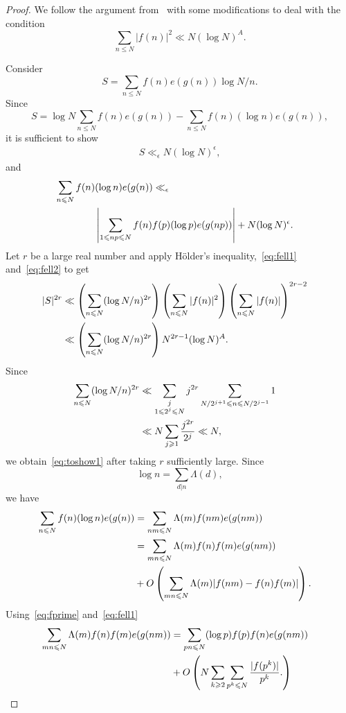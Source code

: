 \documentclass[12pt]{amsart}
\def\\{\cr}
\def\le{\leqslant}
\def\ge{\geqslant}
\begin{document}
\begin{proof}

We follow the argument from~\cite[Section~2]{M-V} with some modifications to deal with the condition
$$\sum_{n\le N}|f(n)|^2\ll N(\log{N})^{A}.$$

Consider 
\begin{equation*}
S=\sum_{n\le N} f(n)e(g(n))\log N/n.
\end{equation*}
Since 
$$S=\log{N}\sum_{n\le N}f(n)e(g(n))-\sum_{n\le N}f(n)(\log{n})e(g(n)),$$
it is sufficient to show 
\begin{align}
\label{eq:toshow1}
S\ll_{\epsilon} N(\log{N})^{\epsilon},
\end{align}
and 
\begin{align}
\label{eq:toshow2}
\sum_{n\le N}f(n)&(\log{n})e(g(n))\ll_{\epsilon} \\ & \left|\sum_{1\le np \le N} f(n)f(p)(\log{p}) e(g(np))\right|+N(\log{N})^{\epsilon}. \nonumber
\end{align}
Let $r$ be a large real number and apply H\"{o}lder's inequality,~\eqref{eq:fell1} and~\eqref{eq:fell2} to get 
\begin{align*}
|S|^{2r}&\ll \left(\sum_{n\le N}(\log{N/n})^{2r} \right)\left(\sum_{n\le N}|f(n)|^{2} \right)\left(\sum_{n\le N}|f(n)| \right)^{2r-2} \\
&\ll \left(\sum_{n\le N}(\log{N/n})^{2r} \right) N^{2r-1}(\log{N})^{A}.
\end{align*}
Since 
\begin{align*}
\sum_{n\le N}(\log{N/n})^{2r}&\ll \sum_{\substack{j \\ 1\le 2^{j}\le N}}j^{2r}\sum_{N/2^{j+1}\le n \le  N/2^{j-1}}1 \\ 
&\ll N\sum_{j\ge 1}\frac{j^{2r}}{2^{j}}\ll N,
\end{align*}
we obtain~\eqref{eq:toshow1} after taking $r$ sufficiently large.
Since 
$$\log n=\sum_{d|n} \Lambda (d),$$ we have 
\begin{align*}
\sum_{n\le N}f(n)(\log{n})e(g(n))&=\sum_{nm\le N}\Lambda(m)f(nm)e(g(nm)) \\ & =\sum_{mn\le N}\Lambda(m)f(n)f(m)e(g(nm)) \\& +O\left(\sum_{mn\le N}\Lambda(m)|f(nm)-f(n)f(m)| \right).
\end{align*}
Using~\eqref{eq:fprime} and~\eqref{eq:fell1}
\begin{align*}
\sum_{mn\le N}\Lambda(m)f(n)f(m)e(g(nm))&=\sum_{pn\le N}(\log{p})f(p) f(n)e(g(nm)) \\ &+O\left(N\sum_{k\ge 2}\sum_{p^{k}\le N}\frac{|f(p^{k})|}{p^{k}}. \right) \\ 

\end{align*}
\end{proof}
\end{document}
